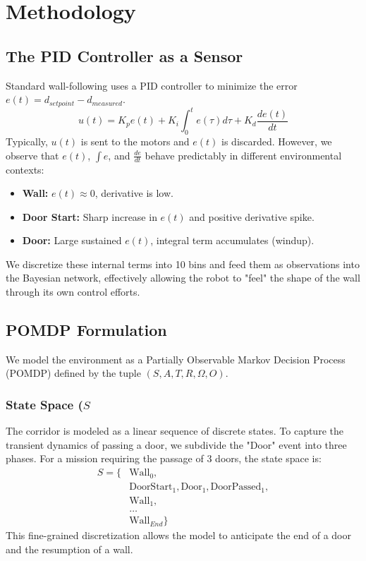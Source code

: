 \documentclass[10pt, twocolumn]{article}
\begin{document}
\section{Methodology}

\subsection{The PID Controller as a Sensor}
Standard wall-following uses a PID controller to minimize the error \(e(t) = d_{setpoint} - d_{measured}\).
\begin{equation}
 u(t) = K_p e(t) + K_i \int_0^t e(\tau) d\tau + K_d \frac{de(t)}{dt}
\end{equation}
Typically, \(u(t)\) is sent to the motors and \(e(t)\) is discarded. However, we observe that \(e(t)\), \(\int e\), and \(\frac{de}{dt}\) behave predictably in different environmental contexts:
\begin{itemize}
    \item \textbf{Wall:} \(e(t) \approx 0\), derivative is low.
    \item \textbf{Door Start:} Sharp increase in \(e(t)\) and positive derivative spike.
    \item \textbf{Door:} Large sustained \(e(t)\), integral term accumulates (windup).
\end{itemize}
We discretize these internal terms into 10 bins and feed them as observations into the Bayesian network, effectively allowing the robot to "feel" the shape of the wall through its own control efforts.

\subsection{POMDP Formulation}
We model the environment as a Partially Observable Markov Decision Process (POMDP) defined by the tuple \((S, A, T, R, \Omega, O)\).

\subsubsection{State Space (\(S\)}
The corridor is modeled as a linear sequence of discrete states. To capture the transient dynamics of passing a door, we subdivide the "Door" event into three phases. For a mission requiring the passage of 3 doors, the state space is:
\begin{align*}
S = \{ &\text{Wall}_0, \\
       &\text{DoorStart}_1, \text{Door}_1, \text{DoorPassed}_1, \\
       &\text{Wall}_1, \\
       &\dots \\
       &\text{Wall}_{End} \}
\end{align*}
This fine-grained discretization allows the model to anticipate the end of a door and the resumption of a wall.
\end{document}
